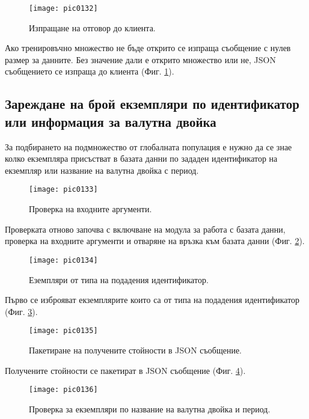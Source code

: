 \begin{figure}[h]
  \centering
  \texttt{[image: pic0132]}
  \caption{Изпращане на отговор до клиента.}
\label{fig:pic0132}
\end{figure}
\FloatBarrier

Ако тренировъчно множество не бъде открито се изпраща съобщение с нулев размер за данните. Без значение дали е открито множество или не, JSON съобщението се изпраща до клиента (Фиг. \ref{fig:pic0132}).

\subsection{Зареждане на брой екземпляри по идентификатор или информация за валутна двойка}

За подбирането на подмножество от глобалната популация е нужно да се знае колко екземпляра присъстват в базата данни по зададен идентификатор на екземпляр или название на валутна двойка с период. 

\begin{figure}[h]
  \centering
  \texttt{[image: pic0133]}
  \caption{Проверка на входните аргументи.}
\label{fig:pic0133}
\end{figure}
\FloatBarrier

Проверката отново започва с включване на модула за работа с базата данни, проверка на входните аргументи и отваряне на връзка към базата данни (Фиг. \ref{fig:pic0133}).

\begin{figure}[h]
  \centering
  \texttt{[image: pic0134]}
  \caption{Еземпляри от типа на подадения идентификатор.}
\label{fig:pic0134}
\end{figure}
\FloatBarrier

Първо се изброяват екземплярите които са от типа на подадения идентификатор (Фиг. \ref{fig:pic0134}).

\begin{figure}[h]
  \centering
  \texttt{[image: pic0135]}
  \caption{Пакетиране на получените стойности в JSON съобщение.}
\label{fig:pic0135}
\end{figure}
\FloatBarrier

Получените стойности се пакетират в JSON съобщение (Фиг. \ref{fig:pic0135}). 

\begin{figure}[h]
  \centering
  \texttt{[image: pic0136]}
  \caption{Проверка за екземпляри по название на валутна двойка и период.}
\label{fig:pic0136}
\end{figure}
\FloatBarrier

